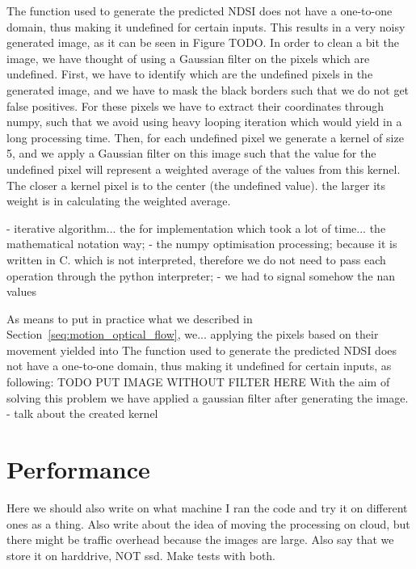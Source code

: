 \documentclass[11pt, a4paper]{report}
\begin{document}
	The function used to generate the predicted NDSI does not have a one-to-one domain, thus making it undefined for certain inputs. This results in a very noisy generated image, as it can be seen in Figure TODO. In order to clean a bit the image, we have thought of using a Gaussian filter on the pixels which are undefined. First, we have to identify which are the undefined pixels in the generated image, and we have to mask the black borders such that we do not get false positives. For these pixels we have to extract their coordinates through numpy, such that we avoid using heavy looping iteration which would yield in a long processing time. Then, for each undefined pixel we generate a kernel of size 5, and we apply a Gaussian filter on this image such that the value for the undefined pixel will represent a weighted average of the values from this kernel. The closer a kernel pixel is to the center (the undefined value). the larger its weight is in calculating the weighted average.
	
	
	- iterative algorithm... the for implementation which took a lot of time... the mathematical notation way;
	- the numpy optimisation processing; because it is written in C. which is not interpreted, therefore we do not need to pass each operation through the python interpreter;
	- we had to signal somehow the nan values
	
	As means to put in practice what we described in Section~\ref{seq:motion_optical_flow}, we...
	applying the pixels based on their movement yielded into 
	The function used to generate the predicted NDSI does not have a one-to-one domain, thus making it undefined for certain inputs, as following:
	TODO PUT IMAGE WITHOUT FILTER HERE
	With the aim of solving this problem we have applied a gaussian filter after generating the image.
	- talk about the created kernel
	
	\tableofcontents{}
	\listoffigures{}
	\listoftables{}
	
	
	
	
	\chapter{Performance}
	\label{seq:performance}
	Here we should also write on what machine I ran the code and try it on different ones as a thing. Also write about the idea of moving the processing on cloud, but there might be traffic overhead because the images are large. Also say that we store it on harddrive, NOT ssd. Make tests with both.
	
\end{document}
